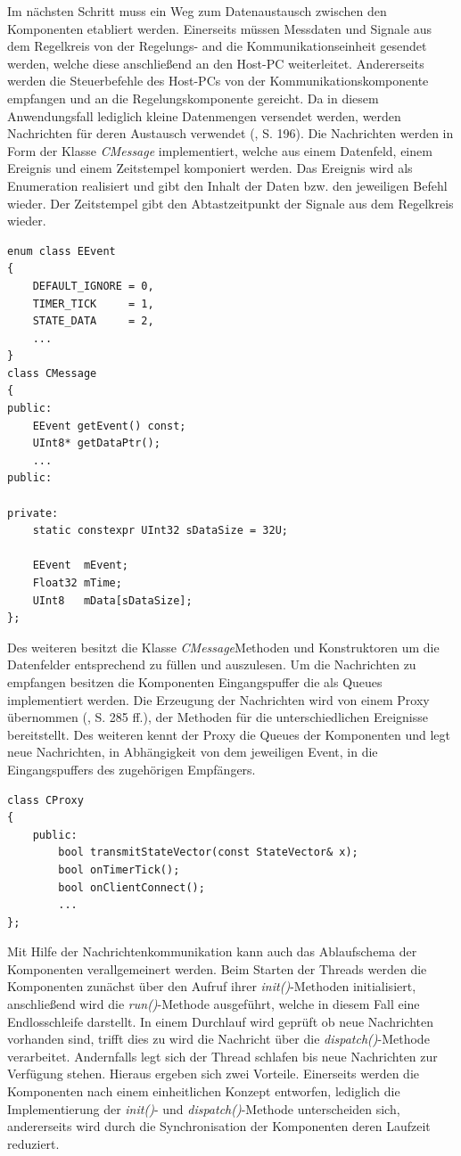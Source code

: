 Im nächsten Schritt muss ein Weg zum Datenaustausch zwischen den Komponenten etabliert werden. Einerseits müssen Messdaten und Signale aus dem Regelkreis von der Regelungs- and die Kommunikationseinheit gesendet werden, welche diese anschließend an den Host-PC weiterleitet. Andererseits werden die Steuerbefehle des Host-PCs von der Kommunikationskomponente empfangen und an die Regelungskomponente gereicht. Da in diesem Anwendungsfall lediglich kleine Datenmengen versendet werden, werden Nachrichten für deren Austausch verwendet (\cite{Wietzke1}, S. 196). Die Nachrichten werden in Form der Klasse \textit{CMessage} implementiert, welche aus einem Datenfeld, einem Ereignis und einem Zeitstempel komponiert werden. Das Ereignis wird als Enumeration realisiert und gibt den Inhalt der Daten bzw. den jeweiligen Befehl wieder. Der Zeitstempel gibt den Abtastzeitpunkt der Signale aus dem Regelkreis wieder. 
\begin{lstlisting}[caption={Beispielhafte Implementierung der Events und Nachrichten},captionpos=b]
enum class EEvent
{
	DEFAULT_IGNORE = 0,
	TIMER_TICK     = 1,
	STATE_DATA     = 2,
	...
}
class CMessage
{
public:
	EEvent getEvent() const;
	UInt8* getDataPtr();
	...
public:

private:
	static constexpr UInt32 sDataSize = 32U;

	EEvent  mEvent;
	Float32 mTime;	
	UInt8   mData[sDataSize];
};
\end{lstlisting}
Des weiteren besitzt die Klasse \textit{CMessage}Methoden und Konstruktoren um die Datenfelder entsprechend zu füllen und auszulesen. Um die Nachrichten zu empfangen besitzen die Komponenten Eingangspuffer die als Queues implementiert werden. Die Erzeugung der Nachrichten wird von einem Proxy übernommen (\cite{Wietzke1}, S. 285 ff.), der Methoden für die unterschiedlichen Ereignisse bereitstellt. Des weiteren kennt der Proxy die Queues der Komponenten und legt neue Nachrichten, in Abhängigkeit von dem jeweiligen Event, in die Eingangspuffers des zugehörigen Empfängers.
\begin{lstlisting}[caption={Aufbau der Proxy-Klasse},captionpos=b]
class CProxy
{
	public:
		bool transmitStateVector(const StateVector& x);
		bool onTimerTick();
		bool onClientConnect();
		...
};
\end{lstlisting}
Mit Hilfe der Nachrichtenkommunikation kann auch das Ablaufschema der Komponenten verallgemeinert werden. Beim Starten der Threads werden die Komponenten zunächst über den Aufruf ihrer \textit{init()}-Methoden initialisiert, anschließend wird die \textit{run()}-Methode ausgeführt, welche in diesem Fall eine Endlosschleife darstellt. In einem Durchlauf wird geprüft ob neue Nachrichten vorhanden sind, trifft dies zu wird die Nachricht über die \textit{dispatch()}-Methode verarbeitet. Andernfalls legt sich der Thread schlafen bis neue Nachrichten zur Verfügung stehen. Hieraus ergeben sich zwei Vorteile. Einerseits werden die Komponenten nach einem einheitlichen Konzept entworfen, lediglich die Implementierung der \textit{init()}- und \textit{dispatch()}-Methode unterscheiden sich, andererseits wird durch die Synchronisation der Komponenten deren Laufzeit reduziert.